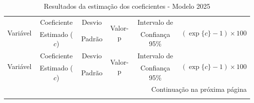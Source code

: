 \documentclass[12pt,a4paper,header]{abnt}
\begin{document}
\begin{center}
\small
\begin{longtable}{lccccc}
\caption{Resultados da estimação dos coeficientes - Modelo 2025}
\label{tab:resultados_2025} \\
\toprule
\multirow{2}{*}{Variável} & Coeficiente & Desvio & \multirow{2}{*}{Valor-p} & Intervalo de & \multirow{2}{*}{$(\exp\{c\}-1)\times 100$} \\
& Estimado ($c$) & Padrão & & Confiança 95\% & \\
\midrule
\endfirsthead

\toprule
\multirow{2}{*}{Variável} & Coeficiente & Desvio & \multirow{2}{*}{Valor-p} & Intervalo de & \multirow{2}{*}{$(\exp\{c\}-1)\times 100$} \\
& Estimado ($c$) & Padrão & & Confiança 95\% & \\
\midrule
\endhead

\midrule
\multicolumn{6}{r}{\small Continuação na próxima página} \\
\midrule
\endfoot

\bottomrule
\endlastfoot


\end{longtable}
\end{center}
\end{document}

